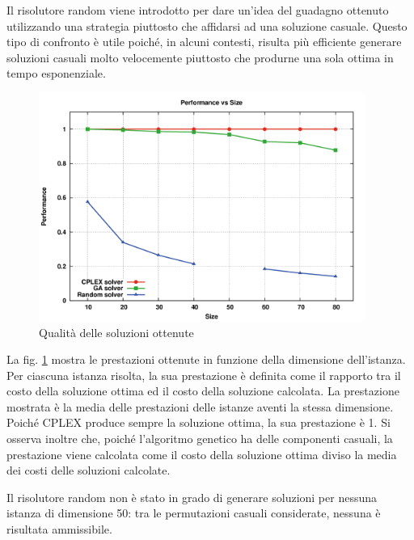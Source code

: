 \documentclass[a4paper, 10pt]{report}
\begin{document}
Il risolutore random viene introdotto per dare un'idea del guadagno
ottenuto utilizzando una strategia piuttosto che affidarsi ad una
soluzione casuale. Questo tipo di confronto è utile poiché, in alcuni
contesti, risulta più efficiente generare soluzioni casuali molto
velocemente piuttosto che produrne una sola ottima in tempo esponenziale.

\begin{figure}
  \centering
  \includegraphics[width=0.95\textwidth]{images/plot-performance}
  \caption{Qualità delle soluzioni ottenute}
  \label{fig:plot-performance}
\end{figure}

La fig. \ref{fig:plot-performance} mostra le prestazioni ottenute in
funzione della dimensione dell'istanza. Per ciascuna istanza risolta,
la sua prestazione è definita come il rapporto tra il costo della
soluzione ottima ed il costo della soluzione calcolata. La prestazione
mostrata è la media delle prestazioni delle istanze aventi la stessa
dimensione. Poiché CPLEX
produce sempre la soluzione ottima, la sua prestazione è 1. Si osserva
inoltre che, poiché l'algoritmo genetico ha delle componenti casuali,
la prestazione viene calcolata come il costo della soluzione ottima
diviso la media dei costi delle soluzioni calcolate.

Il risolutore random non è stato in grado di generare soluzioni per
nessuna istanza di dimensione 50: tra le permutazioni casuali
considerate, nessuna è risultata ammissibile.
\end{document}
